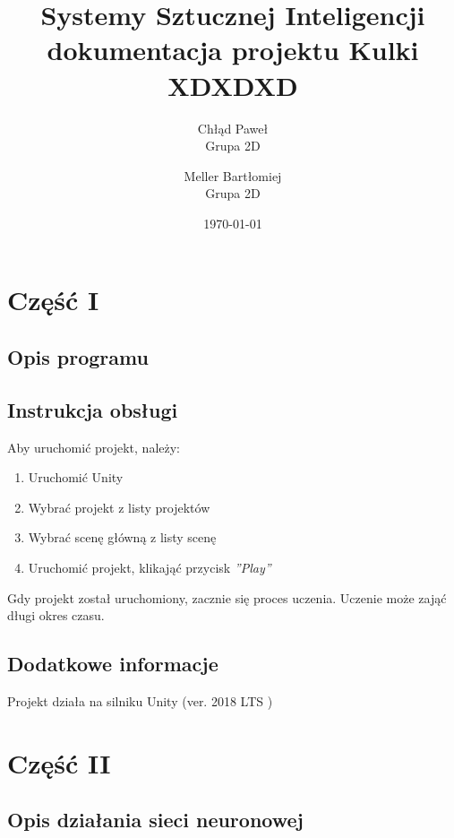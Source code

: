 \documentclass[12pt,a4paper]{article}
\begin{document}
\title{Systemy Sztucznej Inteligencji\\\small{dokumentacja projektu Kulki XDXDXD}}
\author{
    Chłąd Paweł\\
    Grupa 2D
    \and
    Meller Bartłomiej\\
    Grupa 2D}
\date{\today}

\maketitle
\newpage
\section*{Część I}
\subsection*{Opis programu}

\subsection*{Instrukcja obsługi}
Aby uruchomić projekt, należy:
\begin{enumerate}
    \item Uruchomić Unity
    \item Wybrać projekt z listy projektów
    \item Wybrać scenę główną z listy scenę
    \item Uruchomić projekt, klikająć przycisk \textit{''Play''}
\end{enumerate}

Gdy projekt został uruchomiony, zacznie się proces uczenia. Uczenie może zająć długi okres czasu.







\subsection*{Dodatkowe informacje}
Projekt działa na silniku Unity (ver. 2018 LTS )
\newpage
\section*{Część II}


\subsection*{Opis działania sieci neuronowej}
\end{document}
